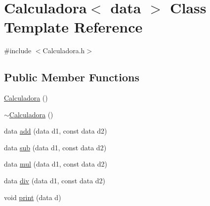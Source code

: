 \hypertarget{class_calculadora}{\section{Calculadora$<$ data $>$ Class Template Reference}
\label{class_calculadora}
}


{\ttfamily \#include $<$Calculadora.\+h$>$}

\subsection*{Public Member Functions}
\begin{DoxyCompactItemize}
\item 
\hyperlink{class_calculadora_accf36b70e9c77c5bae584c8ad064d6f2}{Calculadora} ()
\item 
\hyperlink{class_calculadora_a1e5abf48d231812a274bb6eb274d591c}{$\sim$\+Calculadora} ()
\item 
data \hyperlink{class_calculadora_a1c6404c4aa19ffe4cb058c1abb2d2f8a}{add} (data d1, const data d2)
\item 
data \hyperlink{class_calculadora_af5bbd9064360700bbd127c3e6afdf305}{sub} (data d1, const data d2)
\item 
data \hyperlink{class_calculadora_afacfc36c296f6a40d9356b5c56e9015e}{mul} (data d1, const data d2)
\item 
data \hyperlink{class_calculadora_ab99ff5de96270b2cec697eca2456ba21}{div} (data d1, const data d2)
\item 
void \hyperlink{class_calculadora_a09875d61cc62c0662f34a1ee57f17bac}{print} (data d)
\end{DoxyCompactItemize}


